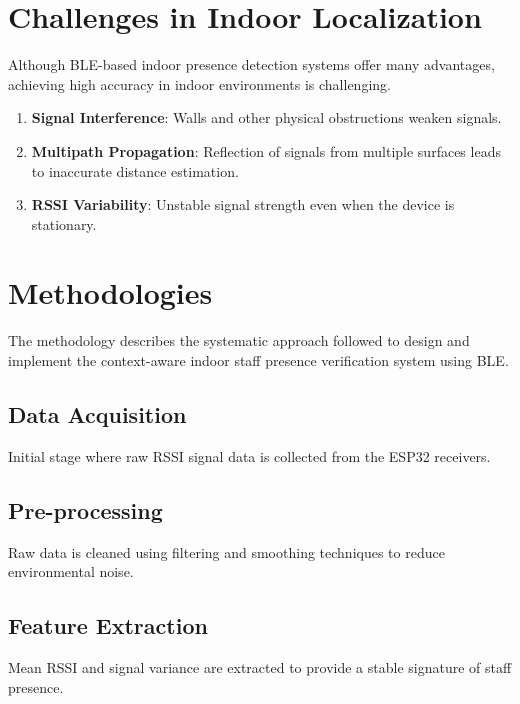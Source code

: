 \section{Challenges in Indoor Localization}
Although BLE-based indoor presence detection systems offer many advantages, achieving high accuracy in indoor environments is challenging.
\begin{enumerate}
    \item \textbf{Signal Interference}: Walls and other physical obstructions weaken signals.
    \item \textbf{Multipath Propagation}: Reflection of signals from multiple surfaces leads to inaccurate distance estimation.
    \item \textbf{RSSI Variability}: Unstable signal strength even when the device is stationary.
\end{enumerate}

\section{Methodologies}
The methodology describes the systematic approach followed to design and implement the context-aware indoor staff presence verification system using BLE.
\subsection{Data Acquisition}
Initial stage where raw RSSI signal data is collected from the ESP32 receivers.
\subsection{Pre-processing}
Raw data is cleaned using filtering and smoothing techniques to reduce environmental noise.
\subsection{Feature Extraction}
Mean RSSI and signal variance are extracted to provide a stable signature of staff presence.
